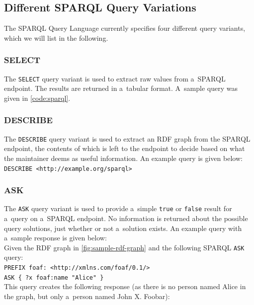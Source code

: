 \subsection{Different SPARQL Query Variations}

The SPARQL Query Language currently specifies four different query variants, which we will list in the following. 

\subsubsection{SELECT}

The \texttt{SELECT} query variant is used to extract
raw values from a~SPARQL endpoint.
The results are returned in a~tabular format.
A~sample query was given in \autoref{code:sparql}.

\subsubsection{DESCRIBE}

The \texttt{DESCRIBE} query variant is used to extract
an RDF graph from the SPARQL endpoint,
the contents of which is left to the endpoint to decide
based on what the maintainer deems as useful information.
An example query is given below:\\

\texttt{DESCRIBE <http://example.org/sparql>}

\subsubsection{ASK}

The \texttt{ASK} query variant is used to provide
a~simple \texttt{true} or \texttt{false} result
for a~query on a~SPARQL endpoint.
No information is returned about the possible query solutions,
just whether or not a~solution exists.
An example query with a~sample response is given below:\\

\noindent Given the RDF graph in \autoref{fig:sample-rdf-graph}
and the following SPARQL \texttt{ASK} query:\\

\texttt{PREFIX foaf: <http://xmlns.com/foaf/0.1/>\\
\indent ASK \{ ?x foaf:name  "Alice" \}}\\

\noindent This query creates the following response
(as there is no person named Alice in the graph,
but only a~person named John X. Foobar):\\

